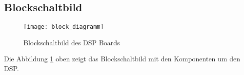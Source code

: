 \subsection{Blockschaltbild}
\label{sec:Blockschaltbild}

\begin{figure}[h]
	\centering
	\texttt{[image: block\_diagramm]}
	\caption{Blockschaltbild des DSP Boards}
	\label{pic:Blockdiagramm}
\end{figure}

Die Abbildung \ref{pic:Blockdiagramm} oben zeigt das Blockschaltbild mit den Komponenten um den DSP. 

